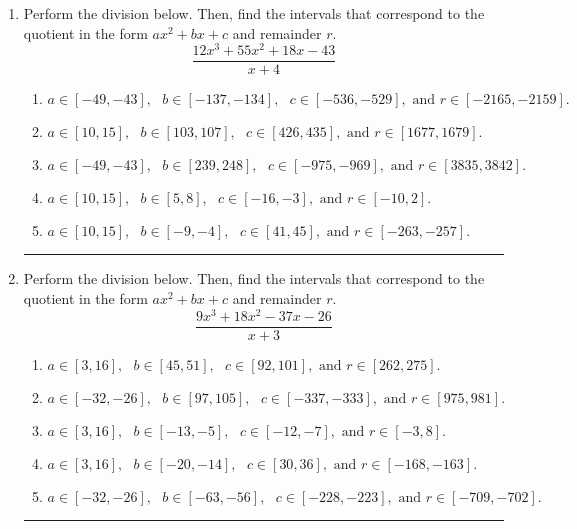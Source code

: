 \documentclass[14pt]{extbook}
\newcommand{\litem}[1]{\item#1\hspace*{-1cm}\rule{\textwidth}{0.4pt}}
\begin{document}
\begin{enumerate}
{\begin{enumerate}[label=\Alph*.]
\end{enumerate} }
\litem{
Perform the division below. Then, find the intervals that correspond to the quotient in the form $ax^2+bx+c$ and remainder $r$.\[ \frac{12x^{3} +55 x^{2} +18 x -43}{x + 4} \]\begin{enumerate}[label=\Alph*.]
\item \( a \in [-49, -43], \text{   } b \in [-137, -134], \text{   } c \in [-536, -529], \text{   and   } r \in [-2165, -2159]. \)
\item \( a \in [10, 15], \text{   } b \in [103, 107], \text{   } c \in [426, 435], \text{   and   } r \in [1677, 1679]. \)
\item \( a \in [-49, -43], \text{   } b \in [239, 248], \text{   } c \in [-975, -969], \text{   and   } r \in [3835, 3842]. \)
\item \( a \in [10, 15], \text{   } b \in [5, 8], \text{   } c \in [-16, -3], \text{   and   } r \in [-10, 2]. \)
\item \( a \in [10, 15], \text{   } b \in [-9, -4], \text{   } c \in [41, 45], \text{   and   } r \in [-263, -257]. \)

\end{enumerate} }
\litem{
Perform the division below. Then, find the intervals that correspond to the quotient in the form $ax^2+bx+c$ and remainder $r$.\[ \frac{9x^{3} +18 x^{2} -37 x -26}{x + 3} \]\begin{enumerate}[label=\Alph*.]
\item \( a \in [3, 16], \text{   } b \in [45, 51], \text{   } c \in [92, 101], \text{   and   } r \in [262, 275]. \)
\item \( a \in [-32, -26], \text{   } b \in [97, 105], \text{   } c \in [-337, -333], \text{   and   } r \in [975, 981]. \)
\item \( a \in [3, 16], \text{   } b \in [-13, -5], \text{   } c \in [-12, -7], \text{   and   } r \in [-3, 8]. \)
\item \( a \in [3, 16], \text{   } b \in [-20, -14], \text{   } c \in [30, 36], \text{   and   } r \in [-168, -163]. \)
\item \( a \in [-32, -26], \text{   } b \in [-63, -56], \text{   } c \in [-228, -223], \text{   and   } r \in [-709, -702]. \)


\end{enumerate}}
\end{enumerate}
\end{document}
